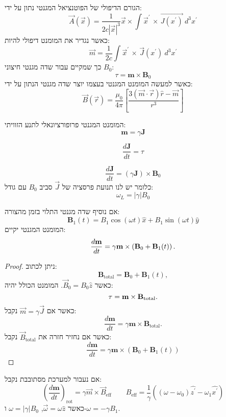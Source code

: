 \documentclass{tstextbook}
\begin{document}
\begin{reminder}
הגורם הדיפולי של הפוטנציאל המגנטי נתון על ידי:
$$\vec{A}\left( \vec{x} \right)={\frac{1}{2c|\vec{x}|^3}}\vec{x} \times\int\vec{x}^{\prime}\,\times\,\vec{J\left( x^{\prime} \right)}\ d^{3}x^{\prime}$$
כאשר נגדיר את המומנט דיפולי להיות:
$$\vec{m}={\frac{1}{2c}}\int\vec{x}^{\prime}\,\times\,\vec{J}\left( x^{\prime} \right)\ d^{3}x^{\prime}$$
כך שמקיים עבור שדה מגנטי חיצוני \(B_{0}\):
$$\tau=\mathbf{m}\times\mathbf{B}_{0}$$
כאשר למעשה המומנט המגנטי בעצמו יוצר שדה מגנטי הנתון על ידי:
$$\vec{B}\left( \vec{r} \right)=\frac{\mu_{0}}{4\pi}\left[ \frac{3\left( \vec{m}\cdot \vec{r} \right)\hat{r}-\vec{m}}{r^{3}} \right]$$

\end{reminder}
\begin{proposition}
המומנט המגנטי פרופורציונאלי לתנע הזוויתי:
$$\mathbf{m}=\gamma\mathbf{J}$$

\end{proposition}
\begin{reminder}
$$\frac{d\mathbf{J}}{d t}=\tau$$

\end{reminder}
\begin{corollary}
$${\frac{d\mathbf{J}}{d t}}=(\gamma\mathbf{J})\times\mathbf{B}_{0}$$
כלומר יש לנו תנועת פרסציה של \(\vec{J}\) סביב \(B_{0}\) עם גודל:
$$\omega_{L}=|\gamma|B_{0}$$

\end{corollary}
\begin{proposition}
אם נוסיף שדה מגנטי התלוי בזמן מהצורה:
$$\mathbf{B}_{1}(t)=B_{1}\cos(\omega t){\hat{x}}+B_{1}\sin(\omega t){\hat{y}}$$
המומנט המגנטי יקיים:
$$\frac{d{\bf m}}{d t}=\gamma{\bf m}\times\left({\bf B}_{0}+{\bf B}_{1}(t)\right).$$

\end{proposition}
\begin{proof}
ניתן לכתוב:
$$\mathbf{B}_{\mathrm{total}}=\mathbf{B}_{0}+\mathbf{B}_{1}(t),$$
כאשר \(\vec{B}_{0}=B_{0}\hat{z}\). המומנט הכולל יהיה:
$$\tau={\bf m}\times{\bf B}_{\mathrm{total}}.$$
כאשר אם \(\vec{m}=\gamma \vec{J}\) נקבל:
$${\frac{d\mathbf{m}}{d t}}=\gamma\mathbf{m}\times\mathbf{B}_{\mathrm{total}}.$$
כאשר אם נחזיר חזרה את \(\vec{B}_{\mathrm{total}}\) נקבל:
$${\frac{d\mathbf{m}}{d t}}=\gamma\mathbf{m}\times\left(\mathbf{B}_{0}+\mathbf{B}_{1}(t)\right)$$

\end{proof}
\begin{corollary}
אם נעבור למערכת מסתובבת נקבל:
$$\left({\frac{d\mathbf{m}}{d t}}\right)_{\mathrm{rot}}=\gamma \vec{m} \times \vec{B}_{\text{eff}}\qquad B_{\text{eff}}=\frac{1}{\gamma}\left(\left( \omega-\omega_{0} \right)\hat{z^{\prime}}-\omega_{1}\hat{x^{\prime}}\right)$$
כאשר \(\vec{\omega}=\omega \hat{z}\), \(\omega=\left\lvert  \gamma  \right\rvert B_{0}\) ו-\(\omega=-\gamma B_{1}\).

\end{corollary}
\end{document}
